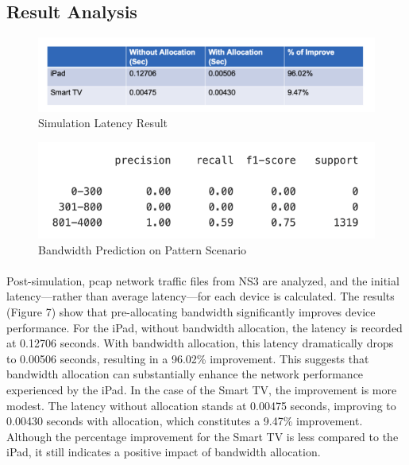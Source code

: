 \documentclass[10pt]{article}
\begin{document}
\subsection{Result Analysis}

\begin{figure}[H]
    \centering
    \includegraphics[width=0.75\linewidth]{Latency Result.png}
    \caption{Simulation Latency Result}
    \label{fig:enter-label}
\end{figure}

\begin{figure}[H]
    \centering
    \includegraphics[width=0.6\linewidth]{Pattern Prediction.png}
    \caption{Bandwidth Prediction on Pattern Scenario
}
    \label{fig:enter-label}
\end{figure}

\paragraph{}
Post-simulation, pcap network traffic files from NS3 are analyzed, and the initial latency—rather than average latency—for each device is calculated. The results (Figure 7) show that pre-allocating bandwidth significantly improves device performance. For the iPad, without bandwidth allocation, the latency is recorded at 0.12706 seconds. With bandwidth allocation, this latency dramatically drops to 0.00506 seconds, resulting in a 96.02\% improvement. This suggests that bandwidth allocation can substantially enhance the network performance experienced by the iPad. In the case of the Smart TV, the improvement is more modest. The latency without allocation stands at 0.00475 seconds, improving to 0.00430 seconds with allocation, which constitutes a 9.47\% improvement. Although the percentage improvement for the Smart TV is less compared to the iPad, it still indicates a positive impact of bandwidth allocation.
\end{document}
